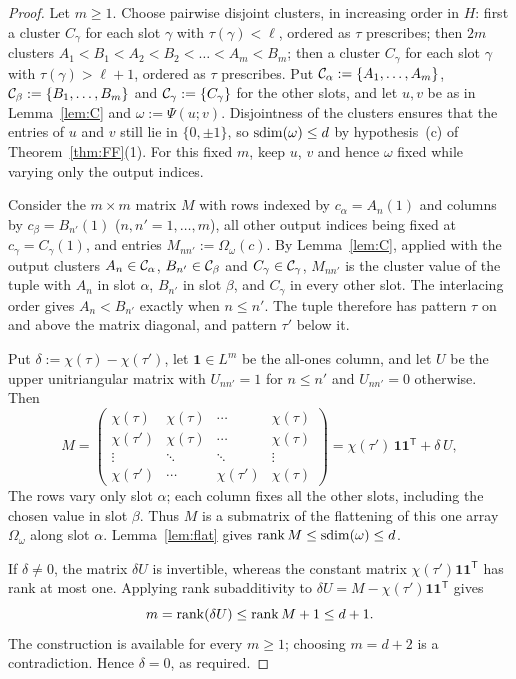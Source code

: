\begin{proof}
Let $m\ge1$. Choose pairwise disjoint clusters, in increasing order in $H$: first a cluster $C_\gamma$ for each slot
$\gamma$ with $\tau(\gamma)<\ell$, ordered as $\tau$ prescribes; then $2m$ clusters $A_1<B_1<A_2<B_2<\dots<A_m<B_m$; then a
cluster $C_\gamma$ for each slot $\gamma$ with $\tau(\gamma)>\ell+1$, ordered as $\tau$ prescribes. Put
$\mathcal{C}_\alpha:=\{A_1,\dots,A_m\}$, $\mathcal{C}_\beta:=\{B_1,\dots,B_m\}$ and $\mathcal{C}_\gamma:=\{C_\gamma\}$ for the other slots, and let
$u,v$ be as in Lemma~\ref{lem:C} and $\omega:=\Psi(u;v)$. Disjointness of the clusters ensures that the entries of
$u$ and $v$ still lie in $\{0,\pm1\}$, so $\operatorname{sdim}(\omega)\le d$ by hypothesis~(c) of Theorem~\ref{thm:FF}(1).
For this fixed $m$, keep $u$, $v$ and hence $\omega$ fixed while varying only the output indices.

Consider the $m\times m$ matrix $M$ with rows indexed by $c_\alpha=A_n(1)$ and columns by $c_\beta=B_{n'}(1)$
($n,n'=1,\dots,m$), all other output indices being fixed at $c_\gamma=C_\gamma(1)$, and entries $M_{nn'}:=\Omega_\omega(c)$.
By Lemma~\ref{lem:C}, applied with the output clusters $A_n\in\mathcal{C}_\alpha$, $B_{n'}\in\mathcal{C}_\beta$ and $C_\gamma\in\mathcal{C}_\gamma$,
$M_{nn'}$ is the cluster value of the tuple with $A_n$ in slot $\alpha$, $B_{n'}$ in slot $\beta$, and $C_\gamma$ in
every other slot. The interlacing order gives $A_n<B_{n'}$ exactly when $n\le n'$. The tuple therefore has pattern
$\tau$ on and above the matrix diagonal, and pattern $\tau'$ below it.

Put $\delta:=\chi(\tau)-\chi(\tau')$, let $\mathbf 1\in L^m$ be the all-ones column, and let $U$ be the upper
unitriangular matrix with $U_{nn'}=1$ for $n\le n'$ and $U_{nn'}=0$ otherwise. Then
\[
M=\begin{pmatrix}
\chi(\tau)&\chi(\tau)&\cdots&\chi(\tau)\\
\chi(\tau')&\chi(\tau)&\cdots&\chi(\tau)\\
\vdots&\ddots&\ddots&\vdots\\
\chi(\tau')&\cdots&\chi(\tau')&\chi(\tau)
\end{pmatrix}
=\chi(\tau')\,\mathbf 1\mathbf 1^{\mathsf T}+\delta\,U,
\]
The rows vary only slot $\alpha$; each column fixes all the other slots, including the chosen value in slot $\beta$.
Thus $M$ is a submatrix of the flattening of this one array $\Omega_\omega$ along slot $\alpha$. Lemma~\ref{lem:flat}
gives $\operatorname{rank} M\le\operatorname{sdim}(\omega)\le d$.

If $\delta\ne0$, the matrix $\delta U$ is invertible, whereas the constant matrix
$\chi(\tau')\mathbf 1\mathbf 1^{\mathsf T}$ has rank at most one. Applying rank subadditivity to
$\delta U=M-\chi(\tau')\mathbf 1\mathbf 1^{\mathsf T}$ gives
\[
m=\operatorname{rank}(\delta U)\le\operatorname{rank} M+1\le d+1.
\]
The construction is available for every $m\ge1$; choosing $m=d+2$ is a contradiction. Hence $\delta=0$, as required.
\end{proof}

